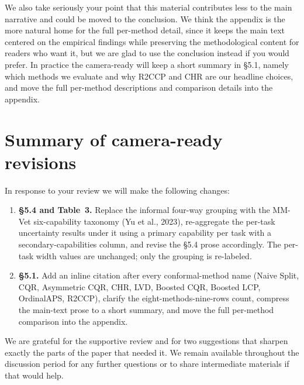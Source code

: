 \documentclass[11pt]{article}
\begin{document}
We also take seriously your point that this material contributes less to the main narrative and could be moved to the conclusion. We think the appendix is the more natural home for the full per-method detail, since it keeps the main text centered on the empirical findings while preserving the methodological content for readers who want it, but we are glad to use the conclusion instead if you would prefer. In practice the camera-ready will keep a short summary in \S 5.1, namely which methods we evaluate and why R2CCP and CHR are our headline choices, and move the full per-method descriptions and comparison details into the appendix.

\section*{Summary of camera-ready revisions}

In response to your review we will make the following changes:
\begin{enumerate}[leftmargin=*]
\item \textbf{\S 5.4 and Table~3.} Replace the informal four-way grouping with the MM-Vet six-capability taxonomy (Yu et al., 2023), re-aggregate the per-task uncertainty results under it using a primary capability per task with a secondary-capabilities column, and revise the \S 5.4 prose accordingly. The per-task width values are unchanged; only the grouping is re-labeled.
\item \textbf{\S 5.1.} Add an inline citation after every conformal-method name (Naive Split, CQR, Asymmetric CQR, CHR, LVD, Boosted CQR, Boosted LCP, OrdinalAPS, R2CCP), clarify the eight-methods-nine-rows count, compress the main-text prose to a short summary, and move the full per-method comparison into the appendix.
\end{enumerate}

We are grateful for the supportive review and for two suggestions that sharpen exactly the parts of the paper that needed it. We remain available throughout the discussion period for any further questions or to share intermediate materials if that would help.
\end{document}
